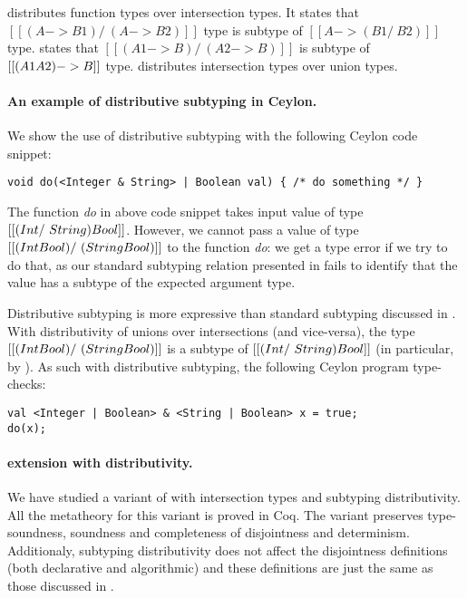  distributes function types over intersection types.
It states that $[[(A -> B1) /\ (A -> B2)]]$ type is subtype of
$[[A -> (B1 /\ B2)]]$ type.
 states that $[[(A1 -> B) /\ (A2 -> B)]]$ is subtype of
$[[(A1 \/ A2) -> B]]$ type.
 distributes intersection types over union types.

\paragraph{An example of distributive subtyping in Ceylon.}
We show the use of distributive subtyping with the following Ceylon code snippet:

\begin{lstlisting}
void do(<Integer & String> | Boolean val) { /* do something */ }
\end{lstlisting}

\noindent
The function \emph{do} in above code snippet takes input value of type $[[(Int
/\ String) \/ Bool]]$. However, we cannot pass a value of type $[[(Int \/ Bool)
/\ (String \/ Bool)]]$ to the function \emph{do}: we get a type error if we try
to do that, as our standard subtyping relation presented in
 fails to identify that the value has a subtype of the
expected argument type.

Distributive subtyping is more expressive than standard subtyping discussed in
. With distributivity of unions over intersections
(and vice-versa), the type $[[(Int \/ Bool) /\ (String \/ Bool)]]$ is a subtype
of $[[(Int /\ String) \/ Bool]]$ (in particular, by ). As such
with distributive subtyping, the following Ceylon program type-checks:

\begin{lstlisting}
val <Integer | Boolean> & <String | Boolean> x = true;
do(x);
\end{lstlisting}


\paragraph{\name extension with distributivity.}
We have studied a variant of \name with intersection types and subtyping distributivity.
All the metatheory for this variant is proved in Coq. The variant preserves
type-soundness, soundness and completeness of disjointness and determinism.
Additionaly, subtyping distributivity
does not affect the disjointness definitions (both declarative and algorithmic)
and these definitions are just the same as those discussed in .


